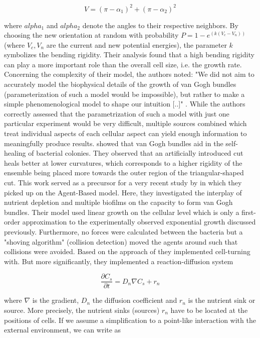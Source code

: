 \documentclass{article}
\begin{document}
\begin{equation}
    V = (\pi - \alpha_1)^2 + (\pi - \alpha_2)^2
\end{equation}

where $alpha_1$ and $alpha_2$ denote the angles to their respective neighbors.
By choosing the new orientation at random with probability $P=1-e^(k(V_c-V_n))$ (where $V_c,V_n$ are
the current and new potential energies), the parameter $k$ symbolizes the bending rigidity.
Their analysis found that a high bending rigidity can play a more important role than the overall
cell size, i.e. the growth rate.
Concerning the complexity of their model, the authors noted:
"We did not aim to accurately model the biophysical details of the growth of van Gogh bundles
(parameterization of such a model would be impossible), but rather to make a simple phenomenological
model to shape our intuition [..]" \cite{vanGestel2015}.
While the authors correctly assessed that the parametrization of such a model with just one
particular experiment would be very difficult, multiple sources combined which treat individual
aspects of each cellular aspect can yield enough information to meaningfully produce results.
\cite{Dong2022} showed that van Gogh bundles aid in the self-healing of bacterial colonies.
They observed that an artificially introduced cut heals better at lower curvatures, which
corresponds to a higher rigidity of the ensemble being placed more towards the outer region of the
triangular-shaped cut.
This work served as a precursor for a very recent study by \cite{Li2025} in which they picked up on
the Agent-Based model.
Here, they investigated the interplay of nutrient depletion and multiple biofilms on the
capacity to form van Gogh bundles.
Their model used linear growth on the cellular level which is only a first-order approximation to
the experimentally observed exponential growth discussed previously.
Furthermore, no forces were calculated between the bacteria but a "shoving algorithm" (collision
detection) moved the agents around such that collisions were avoided.
Based on the approach of \cite{vanGestel2015} they implemented cell-turning with.
But more significantly, they implemented a reaction-diffusion system

\begin{equation}
    \frac{\partial C_s}{\partial t} = D_n \nabla C_s + r_n
\end{equation}

where $\nabla$ is the gradient, $D_n$ the diffusion coefficient and $r_n$ is the nutrient sink or
source.
More precisely, the nutrient sinks (sources) $r_n$ have to be located at the positions of cells.
If we assume a simplification to a point-like interaction with the external environment, we can
write as
\end{document}
